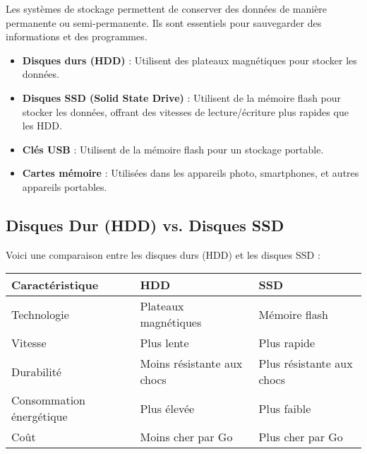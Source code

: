 \documentclass[10pt,a4paper]{article}
\begin{document}
Les systèmes de stockage permettent de conserver des données de manière permanente ou semi-permanente. Ils sont essentiels pour sauvegarder des informations et des programmes.

\begin{itemize}
    \item \textbf{Disques durs (HDD)} : Utilisent des plateaux magnétiques pour stocker les données.
    \item \textbf{Disques SSD (Solid State Drive)} : Utilisent de la mémoire flash pour stocker les données, offrant des vitesses de lecture/écriture plus rapides que les HDD.
    \item \textbf{Clés USB} : Utilisent de la mémoire flash pour un stockage portable.
    \item \textbf{Cartes mémoire} : Utilisées dans les appareils photo, smartphones, et autres appareils portables.
\end{itemize}


\subsection*{Disques Dur (HDD) vs. Disques SSD}

Voici une comparaison entre les disques durs (HDD) et les disques SSD :

\begin{center}
    \begin{tabular}{|l|l|l|}
    \hline
    \textbf{Caractéristique} & \textbf{HDD} & \textbf{SSD} \\
    \hline
    Technologie & Plateaux magnétiques & Mémoire flash \\
    Vitesse & Plus lente & Plus rapide \\
    Durabilité & Moins résistante aux chocs & Plus résistante aux chocs \\
    Consommation énergétique & Plus élevée & Plus faible \\
    Coût & Moins cher par Go & Plus cher par Go \\
    \hline
    \end{tabular}
\end{center}

\end{document}
